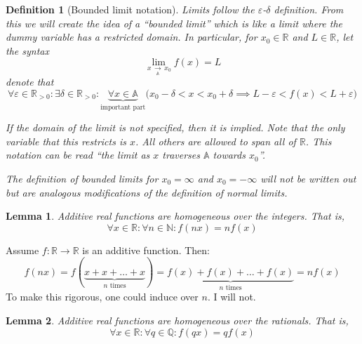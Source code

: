 \documentclass{article}
\theoremstyle{mytheoremstyle}
\newtheorem{lemma}{Lemma}
\newtheorem{definition}{Definition}
\renewenvironment{proof}[1][\proofname]{\noindent{\bfseries #1. }}{\begin{flushright}\smiley\end{flushright}}
\newcommand{\R}{\mathbb R}
\begin{document}

\newcommand{\limx}[3]{ \lim_{\, {#2}\, \underset{#1}{\rightarrow}\,  {#3}} }

\begin{definition}[Bounded limit notation]
Limits follow the $\varepsilon$-$\delta$ definition. From this we will create the idea of a ``bounded limit'' which is like a limit where the dummy variable has a restricted domain. In particular, for $x_0 \in \R$ and $L \in \R$, let the syntax
$$ \limx{\mathbb A}{x}{x_0} f(x) = L $$
denote that
$$ \forall \varepsilon \in \mathbb R_{> 0} : \exists \delta \in \mathbb R_{> 0} : \underbrace{\forall x \in \mathbb A}_\text{important part} \bigg( x_0 - \delta < x < x_0 + \delta \implies L - \varepsilon < f(x) < L + \varepsilon \bigg) $$

If the domain of the limit is not specified, then it is implied. Note that the \textit{only} variable that this restricts is $x$. All others are allowed to span all of $\R$. This notation can be read ``the limit as $x$ traverses $\mathbb A$ towards $x_0$''.

The definition of bounded limits for $x_0 = \infty$ and $x_0 = -\infty$ will not be written out but are analogous modifications of the definition of normal limits.
\end{definition}


\begin{lemma}
\label{lemma:integral-homogeneous}
Additive real functions are homogeneous over the integers. That is,
$$ \forall x \in \mathbb R : \forall n \in \mathbb N : f(nx) = nf(x) $$
\end{lemma}
\begin{proof} Assume $f : \mathbb R \to \mathbb R$ is an additive function. Then:
$$ f(nx) = f(\underbrace{x + x + \dots + x}_{n \text{ times}}) = \underbrace{f(x) + f(x) + \dots + f(x)}_{n \text{ times}} = nf(x) $$
To make this rigorous, one could induce over $n$. I will not.
\end{proof}


\begin{lemma}
\label{lemma:rational-homogeonous}
Additive real functions are homogeneous over the rationals. That is,
$$ \forall x \in \mathbb R : \forall q \in \mathbb Q : f(qx) = qf(x) $$
\end{lemma}
\end{document}
